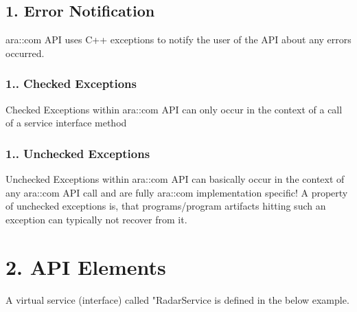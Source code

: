\subsection*{1. Error Notification}


\begin{DoxyItemize}
\item ara\+::com A\+PI uses C++ exceptions to notify the user of the A\+PI about any errors occurred.
\end{DoxyItemize}

\subsubsection*{1.. Checked Exceptions}


\begin{DoxyItemize}
\item Checked Exceptions within ara\+::com A\+PI can only occur in the context of a call of a service interface method
\end{DoxyItemize}

\subsubsection*{1.. Unchecked Exceptions}


\begin{DoxyItemize}
\item Unchecked Exceptions within ara\+::com A\+PI can basically occur in the context of any ara\+::com A\+PI call and are fully ara\+::com implementation specific! A property of unchecked exceptions is, that programs/program artifacts hitting such an exception can typically not recover from it.
\end{DoxyItemize}

\section*{2. A\+PI Elements}


\begin{DoxyItemize}
\item A virtual service (interface) called "Radar\+Service is defined in the below example.
\end{DoxyItemize}


